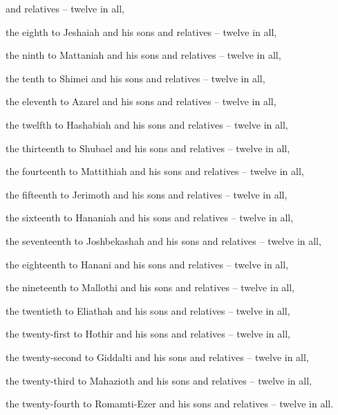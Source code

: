 {and relatives
– twelve in all,
\par }{\PP {}the eighth
to Jeshaiah
and his sons
and relatives
– twelve in all,
\par }{\PP {}the ninth
to Mattaniah
and his sons
and relatives
– twelve in all,
\par }{\PP {}the tenth
to Shimei
and his sons
and relatives
– twelve in all,
\par }{\PP {}the eleventh
to Azarel
and his sons
and relatives
– twelve in all,
\par }{\PP {}the twelfth
to Hashabiah
and his sons
and relatives
– twelve in all,
\par }{\PP {}the thirteenth
to Shubael
and his sons
and relatives
– twelve in all,
\par }{\PP {}the fourteenth
to Mattithiah
and his sons
and relatives
– twelve in all,
\par }{\PP {}the fifteenth
to Jerimoth
and his sons
and relatives
– twelve in all,
\par }{\PP {}the sixteenth
to Hananiah
and his sons
and relatives
– twelve in all,
\par }{\PP {}the seventeenth
to Joshbekashah
and his sons
and relatives
– twelve in all,
\par }{\PP {}the eighteenth
to Hanani
and his sons
and relatives
– twelve in all,
\par }{\PP {}the nineteenth
to Mallothi
and his sons
and relatives
– twelve in all,
\par }{\PP {}the twentieth
to Eliathah
and his sons
and relatives
– twelve in all,
\par }{\PP {}the twenty-first
to Hothir
and his sons
and relatives
– twelve in all,
\par }{\PP {}the twenty-second
to Giddalti
and his sons
and relatives
– twelve in all,
\par }{\PP {}the twenty-third
to Mahazioth
and his sons
and relatives
– twelve in all,
\par }{\PP {}the twenty-fourth
to Romamti-Ezer
and his sons
and relatives
– twelve in all.

}
